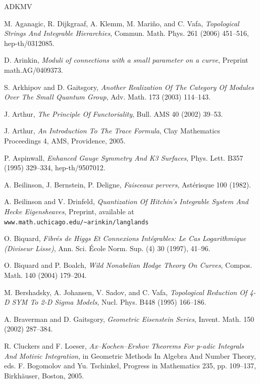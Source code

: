 \documentclass[11pt,a4paper]{article}
\begin{document}
\clearpage
\begin{thebibliography}{ADKMV}

 M. Aganagic, R. Dijkgraaf, A. Klemm, M. Mari\~no, and C. Vafa, \emph{Topological Strings And Integrable Hierarchies}, Commun. Math. Phys. 261 (2006) 451--516, hep-th/0312085.

 D. Arinkin, \emph{Moduli of connections with a small parameter on a curve}, Preprint math.AG/0409373.

 S. Arkhipov and D. Gaitsgory, \emph{Another Realization Of The Category Of Modules Over The Small Quantum Group}, Adv. Math. 173 (2003) 114--143.

 J. Arthur, \emph{The Principle Of Functoriality}, Bull. AMS 40 (2002) 39--53.

 J. Arthur, \emph{An Introduction To The Trace Formula}, Clay Mathematics Proceedings 4, AMS, Providence, 2005.

 P. Aspinwall, \emph{Enhanced Gauge Symmetry And K3 Surfaces}, Phys. Lett. B357 (1995) 329--334, hep-th/9507012.

 A. Beilinson, J. Bernstein, P. Deligne, \emph{Faisceaux pervers}, Ast\'erisque 100 (1982).

 A. Beilinson and V. Drinfeld, \emph{Quantization Of Hitchin's Integrable System And Hecke Eigensheaves}, Preprint, available at \texttt{www.math.uchicago.edu/\textasciitilde arinkin/langlands}

 O. Biquard, \emph{Fibr\'es de Higgs Et Connexions Int\'egrables: Le Cas Logarithmique (Diviseur Lisse)}, Ann. Sci. \'Ecole Norm. Sup. (4) 30 (1997), 41--96.

 O. Biquard and P. Boalch, \emph{Wild Nonabelian Hodge Theory On Curves}, Compos. Math. 140 (2004) 179--204.

 M. Bershadsky, A. Johansen, V. Sadov, and C. Vafa, \emph{Topological Reduction Of 4-D SYM To 2-D Sigma Models}, Nucl. Phys. B448 (1995) 166--186.

 A. Braverman and D. Gaitsgory, \emph{Geometric Eisenstein Series}, Invent. Math. 150 (2002) 287--384.

 R. Cluckers and F. Loeser, \emph{Ax--Kochen--Ershov Theorems For p-adic Integrals And Motivic Integration}, in Geometric Methods In Algebra And Number Theory, eds. F. Bogomolov and Yu. Tschinkel, Progress in Mathematics 235, pp. 109--137, Birkh\"auser, Boston, 2005.


\end{thebibliography}
\end{document}
